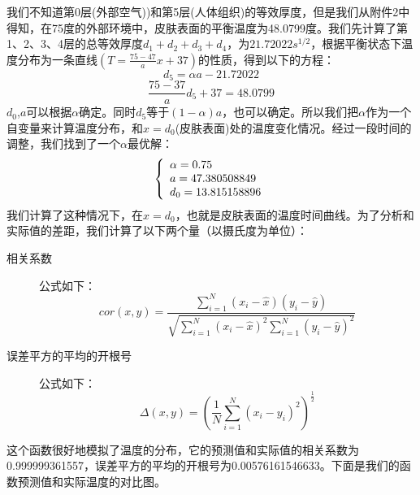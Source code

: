 \documentclass[bwprint]{cumcmthesis}
\begin{document}
    \indent 我们不知道第0层(外部空气))和第5层(人体组织)的等效厚度，但是我们从附件2中得知，在75度的外部环境中，皮肤表面的平衡温度为48.0799度。我们先计算了第1、2、3、4层的总等效厚度$d_1+d_2+d_3+d_4$，为$21.72022 s^{1/2}$，根据平衡状态下温度分布为一条直线$(T = \frac{75-47}{a}x+37)$的性质，得到以下的方程：
    \begin{equation}
        d_5 = \alpha a - 21.72022
    \end{equation}
    \begin{equation}
        \frac{75-37}{a}d_5 + 37 = 48.0799    
    \end{equation}
    \indent $d_0$,$a$可以根据$\alpha$确定。同时$d_5$等于$(1-\alpha)a$，也可以确定。所以我们把$\alpha$作为一个自变量来计算温度分布，和$x=d_0$(皮肤表面)处的温度变化情况。经过一段时间的调整，我们找到了一个$\alpha$最优解：
    \begin{equation}
        \centering
        \left\{  
     \begin{array}{lr}  
        \alpha=0.75 \\   
        a=47.380508849 \\
        d_0=13.815158896
     \end{array}  
    \right.
    \end{equation}
    \indent  我们计算了这种情况下，在$x=d_0$，也就是皮肤表面的温度时间曲线。为了分析和实际值的差距，我们计算了以下两个量（以摄氏度为单位）：\\
    \begin{description}
        \item[相关系数] 公式如下：
        \begin{equation}
            cor(x,y) = \frac{\sum_{i=1}^N(x_i-\hat{x})(y_i-\hat{y})}{\sqrt{\sum_{i=1}^N(x_i-\hat{x})^2  \sum_{i=1}^N(y_i-\hat{y})^2}}
        \end{equation}
        \item[误差平方的平均的开根号] 公式如下：
        \begin{equation}
            \Delta(x,y) = \left(\frac{1}{N} \sum_{i=1}^N(x_i-y_i)^2 \right)^\frac{1}{2} 
        \end{equation} 
    \end{description}
    \indent 这个函数很好地模拟了温度的分布，它的预测值和实际值的相关系数为0.999999361557，误差平方的平均的开根号为0.00576161546633。下面是我们的函数预测值和实际温度的对比图。
\end{document}
